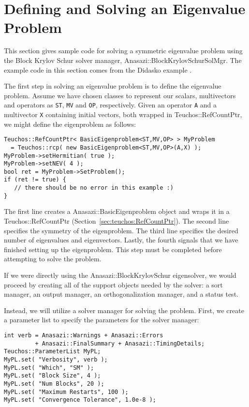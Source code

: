 \section{Defining and Solving an Eigenvalue Problem}
\label{sec:anasazi:example}

This section gives sample code for solving a symmetric eigenvalue problem using
the Block Krylov Schur solver manager, Anasazi::BlockKrylovSchurSolMgr. The example code in this section comes from the
Didasko example .

The first step in solving an eigenvalue problem is to define the eigenvalue
problem. Assume we have chosen classes to represent our scalars, multivectors
and operators as \verb!ST!, \verb!MV! and \verb!OP!, respectively. Given an
operator \verb!A! and a multivector \verb!X! containing initial vectors, both
wrapped in Teuchos::RefCountPtr, we might define the eigenproblem as
follows:
\begin{verbatim}
Teuchos::RefCountPtr< BasicEigenproblem<ST,MV,OP> > MyProblem 
  = Teuchos::rcp( new BasicEigenproblem<ST,MV,OP>(A,X) );
MyProblem->setHermitian( true );
MyProblem->setNEV( 4 );
bool ret = MyProblem->SetProblem();
if (ret != true) {
   // there should be no error in this example :)
}
\end{verbatim}

The first line creates a Anasazi::BasicEigenproblem object and wraps it in a
Teuchos::\-RefCountPtr (Section~\ref{sec:teuchos:RefCountPtr}). The second line
specifies the symmetry of the eigenproblem.
The third line specifies the desired
number of eigenvalues and eigenvectors. Lastly, the fourth signals that we have
finished setting up the eigenproblem. This step must be completed before
attempting to solve the problem.

If we were directly using the Anasazi::BlockKrylovSchur eigensolver, we would proceed by
creating all of the support objects needed by the solver: a sort manager, an output
manager, an orthogonalization manager, and a status test.

Instead, we will utilize a solver manager for solving the problem.
First, we create a parameter list to specify the parameters for the solver manager:
\begin{verbatim}
int verb = Anasazi::Warnings + Anasazi::Errors 
         + Anasazi::FinalSummary + Anasazi::TimingDetails;
Teuchos::ParameterList MyPL;
MyPL.set( "Verbosity", verb );
MyPL.set( "Which", "SM" );
MyPL.set( "Block Size", 4 );
MyPL.set( "Num Blocks", 20 );
MyPL.set( "Maximum Restarts", 100 );
MyPL.set( "Convergence Tolerance", 1.0e-8 );
\end{verbatim}

